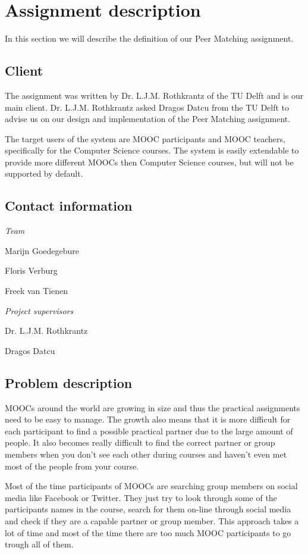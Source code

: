 \documentclass[]{article}
\begin{document}
\section{Assignment description}
In this section we will describe the definition of our Peer Matching assignment.

\subsection{Client}
The assignment was written by Dr. L.J.M. Rothkrantz of the TU Delft and is our main client.
Dr. L.J.M. Rothkrantz asked Dragos Datcu from the TU Delft to advise us on our design and implementation of the Peer Matching assignment.

The target users of the system are MOOC participants and MOOC teachers, specifically for the Computer Science courses. The system is easily extendable to provide more different MOOCs then Computer Science courses, but will not be supported by default.

\subsection{Contact information}
\emph{Team}

Marijn Goedegebure

Floris Verburg

Freek van Tienen

\noindent\emph{Project supervisors}

Dr. L.J.M. Rothkrantz

Dragos Datcu

\subsection{Problem description}
MOOCs around the world are growing in size and thus the practical assignments need to be easy to manage.
The growth also means that it is more difficult for each participant to find a possible practical partner due to the large amount of people.
It also becomes really difficult to find the correct partner or group members when you don't see each other during courses and haven't even met most of the people from your course.

Most of the time participants of MOOCs are searching group members on social media like Facebook or Twitter.
They just try to look through some of the participants names in the course, search for them on-line through social media and check if they are a capable partner or group member.
This approach takes a lot of time and most of the time there are too much MOOC participants to go trough all of them.
\end{document}
